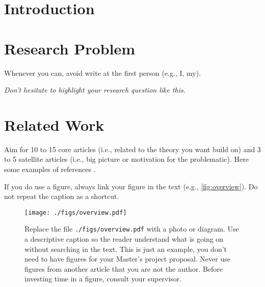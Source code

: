 \documentclass[10pt,letterpaper,oneside]{article}
\newcommand{\lightlipsum}[1][0]{\textcolor{gray!50}{\lipsum[#1]}}
\begin{document}
\makeCustomTitle
\thispagestyle{titlePage}

\section{Introduction}

\lightlipsum[1-2]

\section{Research Problem}

Whenever you can, avoid write at the first person (e.g., I, my).

\lightlipsum[1]

\begin{center}
\emph{
Don't hesitate to highlight your research question like this.
}
\end{center}

\lightlipsum[1]

\section{Related Work}
Aim for 10 to 15 core articles (i.e., related to the theory you want build on) and 3 to 5 satellite articles (i.e., big picture or motivation for the problematic).
Here some examples of references \cite{Pomerleau2013,Pomerleau2014}.

\lightlipsum[1-3]

If you do use a figure, always link your figure in the text (e.g., \autoref{fig:overview}).
Do not repeat the caption as a shortcut.

\begin{figure}[htb]
\centering
\texttt{[image: ./figs/overview.pdf]}
\caption{
Replace the file \texttt{./figs/overview.pdf} with a photo or diagram.
Use a descriptive caption so the reader understand what is going on without searching in the text.
This is just an example, you don't need to have figures for your Master's project proposal.
Never use figures from another article that you are not the author.
Before investing time in a figure, consult your supervisor.
}
\label{fig:overview}
\end{figure}

\lightlipsum[1-2]
\end{document}
